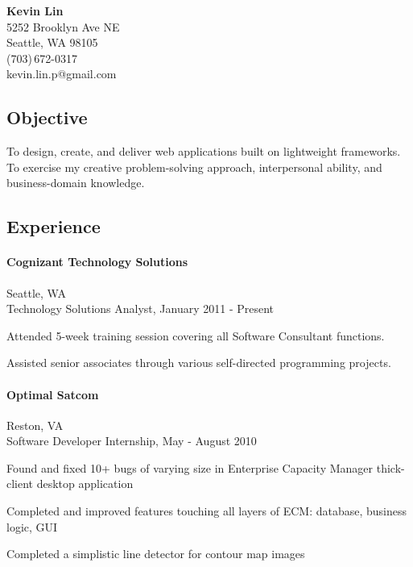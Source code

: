 \documentclass[10pt]{article}
\begin{document}
\begin{center}
\textbf{Kevin Lin} \\
5252 Brooklyn Ave NE \\ Seattle, WA 98105\\
(703)\,672-0317\\
kevin.lin.p@gmail.com \\
\end{center}


\subsection*{Objective}
To design, create, and deliver web applications built on lightweight frameworks. To exercise my creative problem-solving approach, interpersonal ability, and business-domain knowledge.


\subsection*{Experience}

\paragraph*{Cognizant Technology Solutions}
Seattle, WA\\
Technology Solutions Analyst, January 2011 - Present
\begin{compactitem}
\item Attended 5-week training session covering all Software Consultant functions.
\item Assisted senior associates through various self-directed programming projects.
\end{compactitem}

\paragraph*{Optimal Satcom}
Reston, VA\\
Software Developer Internship, May - August 2010
\begin{compactitem}
\item Found and fixed 10+ bugs of varying size in Enterprise Capacity Manager thick-client desktop application
\item Completed and improved features touching all layers of ECM: database, business logic, GUI
\item Completed a simplistic line detector for contour map images
\end{compactitem}
\end{document}
